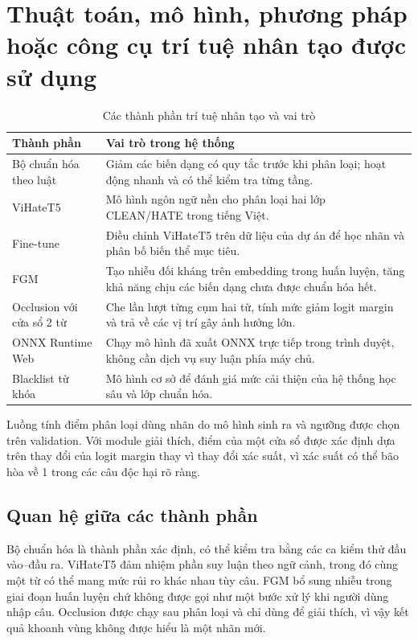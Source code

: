 \documentclass[12pt,a4paper]{article}
\begin{document}
\section{Thuật toán, mô hình, phương pháp hoặc công cụ trí tuệ nhân tạo được sử dụng}
\begin{table}[H]
\centering
\caption{Các thành phần trí tuệ nhân tạo và vai trò}
\label{tab:components}
\begin{tabularx}{\textwidth}{p{}p{}}
\toprule
\textbf{Thành phần} & \textbf{Vai trò trong hệ thống}\\
\midrule
Bộ chuẩn hóa theo luật & Giảm các biến dạng có quy tắc trước khi phân loại; hoạt động nhanh và có thể kiểm tra từng tầng.\\
ViHateT5 & Mô hình ngôn ngữ nền cho phân loại hai lớp CLEAN/HATE trong tiếng Việt.\\
Fine-tune & Điều chỉnh ViHateT5 trên dữ liệu của dự án để học nhãn và phân bố biến thể mục tiêu.\\
FGM & Tạo nhiễu đối kháng trên embedding trong huấn luyện, tăng khả năng chịu các biến dạng chưa được chuẩn hóa hết.\\
Occlusion với cửa sổ 2 từ & Che lần lượt từng cụm hai từ, tính mức giảm logit margin và trả về các vị trí gây ảnh hưởng lớn.\\
ONNX Runtime Web & Chạy mô hình đã xuất ONNX trực tiếp trong trình duyệt, không cần dịch vụ suy luận phía máy chủ.\\
Blacklist từ khóa & Mô hình cơ sở để đánh giá mức cải thiện của hệ thống học sâu và lớp chuẩn hóa.\\
\bottomrule
\end{tabularx}
\end{table}

Luồng tính điểm phân loại dùng nhãn do mô hình sinh ra và ngưỡng được chọn trên validation. Với module giải thích, điểm của một cửa sổ được xác định dựa trên thay đổi của logit margin thay vì thay đổi xác suất, vì xác suất có thể bão hòa về 1 trong các câu độc hại rõ ràng.

\subsection{Quan hệ giữa các thành phần}
Bộ chuẩn hóa là thành phần xác định, có thể kiểm tra bằng các ca kiểm thử đầu vào--đầu ra. ViHateT5 đảm nhiệm phần suy luận theo ngữ cảnh, trong đó cùng một từ có thể mang mức rủi ro khác nhau tùy câu. FGM bổ sung nhiễu trong giai đoạn huấn luyện chứ không được gọi như một bước xử lý khi người dùng nhập câu. Occlusion được chạy sau phân loại và chỉ dùng để giải thích, vì vậy kết quả khoanh vùng không được hiểu là một nhãn mới.
\end{document}
